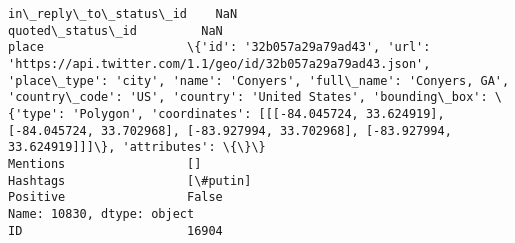 \documentclass[11pt]{article}
\begin{document}
\begin{Verbatim}[commandchars=\\\{\}]
in\_reply\_to\_status\_id    NaN                                                                                                                                                                                                                                                                                                                                                                                               
quoted\_status\_id         NaN                                                                                                                                                                                                                                                                                                                                                                                               
place                    \{'id': '32b057a29a79ad43', 'url': 'https://api.twitter.com/1.1/geo/id/32b057a29a79ad43.json', 'place\_type': 'city', 'name': 'Conyers', 'full\_name': 'Conyers, GA', 'country\_code': 'US', 'country': 'United States', 'bounding\_box': \{'type': 'Polygon', 'coordinates': [[[-84.045724, 33.624919], [-84.045724, 33.702968], [-83.927994, 33.702968], [-83.927994, 33.624919]]]\}, 'attributes': \{\}\}
Mentions                 []                                                                                                                                                                                                                                                                                                                                                                                                
Hashtags                 [\#putin]                                                                                                                                                                                                                                                                                                                                                                                          
Positive                 False                                                                                                                                                                                                                                                                                                                                                                                             
Name: 10830, dtype: object
ID                       16904                                                                                                                                                                                                                                                                                                                                                                                                 

\end{Verbatim}
\end{document}
